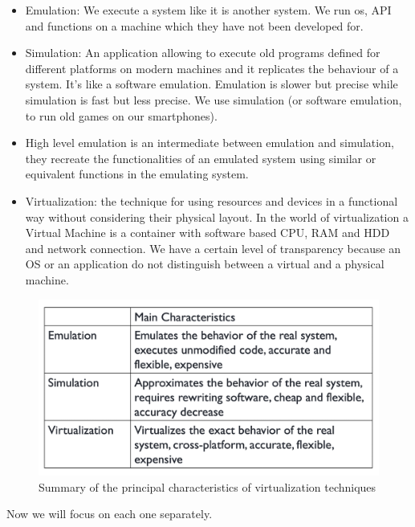 \begin{itemize}
    \item Emulation: We execute a system like it is another system. We run os, API and functions on a machine which they have not been developed for.
    \item Simulation: An application allowing to execute old programs defined for different platforms on modern machines and it replicates the behaviour of a system. It's like a software emulation. \n
    Emulation is slower but precise while simulation is fast but less precise. We use simulation (or software emulation, to run old games on our smartphones).
    \item High level emulation is an intermediate between emulation and simulation, they recreate the functionalities of an emulated system using similar or equivalent functions in the emulating system.
    \item Virtualization: the technique for using resources and devices in a functional way without considering their physical layout. \n
    In the world of virtualization a Virtual Machine is a container with software based CPU, RAM and HDD and network connection. We have a certain level of transparency because an OS or an application do not distinguish between a virtual and a physical machine.
\end{itemize}
\begin{figure}
    \centering
    \includegraphics[scale=0.4]{img/summary_virtualization.png}
    \caption{Summary of the principal characteristics of virtualization techniques}
\end{figure}
Now we will focus on each one separately.
